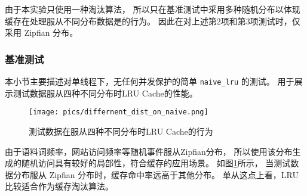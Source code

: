 由于本实验只使用一种淘汰算法，
所以只在基准测试中采用多种随机分布以体现缓存在处理服从不同分布数据是的行为。
因此在对上述第2项和第3项测试时，仅采用 Zipfian 分布\cite{dirtyzipf2024}。

\subsubsection{基准测试}

本小节主要描述对单线程下，无任何并发保护的简单 \verb|naive_lru| 的测试。
用于展示测试数据服从四种不同分布时LRU Cache的性能。

\begin{figure}
    \centering
    \texttt{[image: pics/differnent\_dist\_on\_naive.png]}
    \caption{测试数据在服从四种不同分布时LRU Cache的行为}
    \label{fig:4-different-dists-lru-hit-ratio}
\end{figure}

由于语料词频率，网站访问频率等随机事件服从Zipfian分布，
所以使用该分布生成的随机访问具有较好的局部性，符合缓存的应用场景。
如图\ref{fig:4-different-dists-lru-hit-ratio}所示，
当测试数据分布服从 Zipfian 分布时，缓存命中率远高于其他分布。
单从这点上看，LRU比较适合作为缓存淘汰算法。


